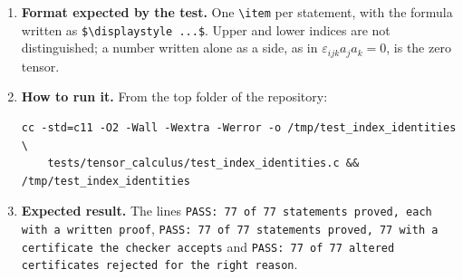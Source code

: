 \documentclass[11pt,a4paper]{article}
\begin{document}
\begin{enumerate}
\item \textbf{Format expected by the test.} One \texttt{\textbackslash item} per statement, with the formula written as \texttt{\$\textbackslash displaystyle ...\$}. Upper and lower indices are not distinguished; a number written alone as a side, as in $\varepsilon_{ijk} a_{j} a_{k} = 0$, is the zero tensor.

\item \textbf{How to run it.} From the top folder of the repository:
\begin{verbatim}
cc -std=c11 -O2 -Wall -Wextra -Werror -o /tmp/test_index_identities \
    tests/tensor_calculus/test_index_identities.c && /tmp/test_index_identities
\end{verbatim}

\item \textbf{Expected result.} The lines \texttt{PASS: 77 of 77 statements proved, each with a written proof}, \texttt{PASS: 77 of 77 statements proved, 77 with a certificate the checker accepts} and \texttt{PASS: 77 of 77 altered certificates rejected for the right reason}.
\end{enumerate}
\end{document}
